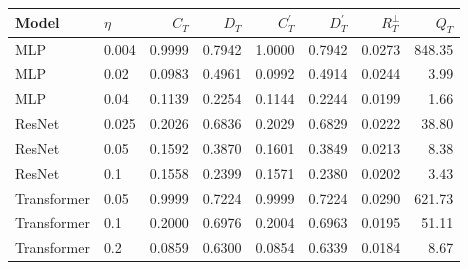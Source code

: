 \begin{tabular}{@{}llrrrrrr@{}}
\toprule
Model & $\eta$ & $C_T$ & $D_T$ & $C_T^{\prime}$ & $D_T^{\prime}$ & $R_T^{\perp}$ & $Q_T$ \\
\midrule
MLP & 0.004 & 0.9999 & 0.7942 & 1.0000 & 0.7942 & 0.0273 & 848.35 \\
MLP & 0.02 & 0.0983 & 0.4961 & 0.0992 & 0.4914 & 0.0244 & 3.99 \\
MLP & 0.04 & 0.1139 & 0.2254 & 0.1144 & 0.2244 & 0.0199 & 1.66 \\
\midrule
ResNet & 0.025 & 0.2026 & 0.6836 & 0.2029 & 0.6829 & 0.0222 & 38.80 \\
ResNet & 0.05 & 0.1592 & 0.3870 & 0.1601 & 0.3849 & 0.0213 & 8.38 \\
ResNet & 0.1 & 0.1558 & 0.2399 & 0.1571 & 0.2380 & 0.0202 & 3.43 \\
\midrule
Transformer & 0.05 & 0.9999 & 0.7224 & 0.9999 & 0.7224 & 0.0290 & 621.73 \\
Transformer & 0.1 & 0.2000 & 0.6976 & 0.2004 & 0.6963 & 0.0195 & 51.11 \\
Transformer & 0.2 & 0.0859 & 0.6300 & 0.0854 & 0.6339 & 0.0184 & 8.67 \\
\bottomrule
\end{tabular}
